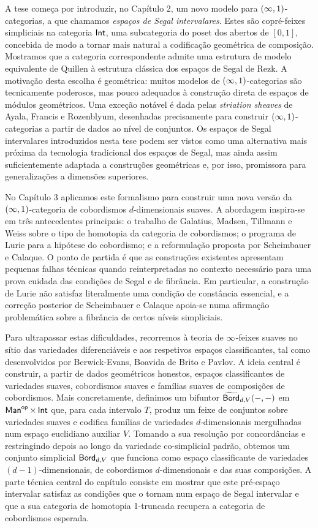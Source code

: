 A tese começa por introduzir, no Capítulo 2, um novo modelo para $(\operatorname{\infty},1)$-categorias, a que chamamos \emph{espaços de Segal intervalares}. Estes são copré-feixes simpliciais na categoria $\operatorname{\mathsf{Int}}$, uma subcategoria do poset dos abertos de $[0,1]$, concebida de modo a tornar mais natural a codificação geométrica de composição. Mostramos que a categoria correspondente admite uma estrutura de modelo equivalente de Quillen à estrutura clássica dos espaços de Segal de Rezk. A motivação desta escolha é geométrica: muitos modelos de $(\operatorname{\infty},1)$-categorias são tecnicamente poderosos, mas pouco adequados à construção direta de espaços de módulos geométricos. Uma exceção notável é dada pelas \emph{striation sheaves} de Ayala, Francis e Rozenblyum, desenhadas precisamente para construir $(\operatorname{\infty},1)$-categorias a partir de dados ao nível de conjuntos. Os espaços de Segal intervalares introduzidos nesta tese podem ser vistos como uma alternativa mais próxima da tecnologia tradicional dos espaços de Segal, mas ainda assim suficientemente adaptada a construções geométricas e, por isso, promissora para generalizações a dimensões superiores.

No Capítulo 3 aplicamos este formalismo para construir uma nova versão da $(\operatorname{\infty},1)$-categoria de cobordismos $d$-dimensionais suaves. A abordagem inspira-se em três antecedentes principais: o trabalho de Galatius, Madsen, Tillmann e Weiss sobre o tipo de homotopia da categoria de cobordismos; o programa de Lurie para a hipótese do cobordismo; e a reformulação proposta por Scheimbauer e Calaque. O ponto de partida é que as construções existentes apresentam pequenas falhas técnicas quando reinterpretadas no contexto necessário para uma prova cuidada das condições de Segal e de fibrância. Em particular, a construção de Lurie não satisfaz literalmente uma condição de constância essencial, e a correção posterior de Scheimbauer e Calaque apoia-se numa afirmação problemática sobre a fibrância de certos níveis simpliciais.

Para ultrapassar estas dificuldades, recorremos à teoria de $\operatorname{\infty}$-feixes suaves no sítio das variedades diferenciáveis e aos respetivos espaços classificantes, tal como desenvolvidos por Berwick-Evans, Boavida de Brito e Pavlov. A ideia central é construir, a partir de dados geométricos honestos, espaços classificantes de variedades suaves, cobordismos suaves e famílias suaves de composições de cobordismos. Mais concretamente, definimos um bifuntor $\widetilde{\operatorname{\mathsf{Bord}}}_{d,V}(-,-)$ em $\operatorname{\sf Man}^{\mathsf{op}}\times \operatorname{\mathsf{Int}}$ que, para cada intervalo $T$, produz um feixe de conjuntos sobre variedades suaves e codifica famílias de variedades $d$-dimensionais mergulhadas num espaço euclidiano auxiliar $V$. Tomando a sua resolução por concordâncias e restringindo depois ao longo da variedade co-simplicial padrão, obtemos um conjunto simplicial $\operatorname{\mathsf{Bord}}_{d,V}$ que funciona como espaço classificante de variedades $(d-1)$-dimensionais, de cobordismos $d$-dimensionais e das suas composições. A parte técnica central do capítulo consiste em mostrar que este pré-espaço intervalar satisfaz as condições que o tornam num espaço de Segal intervalar e que a sua categoria de homotopia 1-truncada recupera a categoria de cobordismos esperada.

